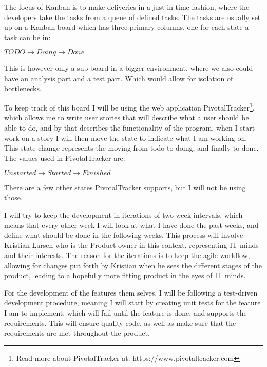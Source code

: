 The focus of Kanban is to make deliveries in a just-in-time fashion, where the
developers take the tasks from a queue of defined tasks. The tasks are usually
set up on a Kanban board which has three primary columns, one for each state a
task can be in: 

\begin{center}
  $TODO \rightarrow Doing \rightarrow Done$
\end{center}

This is however only a sub board in a bigger environment, where we also could
have an analysis part and a test part. Which would allow for isolation of
bottlenecks\cite{kanban}. 

To keep track of this board I will be using the web application
PivotalTracker\footnote{Read more about PivotalTracker at:
  https://www.pivotaltracker.com}, which allows me to write user stories that
will describe what a user should be able to do, and by that describes the
functionality of the program, when I start work on a story I will then move
the state to indicate what I am working on. This state change represents the
moving from todo to doing, and finally to done. The values used in
PivotalTracker are: 

\begin{center}
  $Unstarted \rightarrow Started \rightarrow Finished$
\end{center}

There are a few other states PivotalTracker supports, but I will not be using
those. 

I will try to keep the development in iterations of two week intervals, which
means that every other week I will look at what I have done the past weeks, and define
what should be done in the following weeks. This process will involve Kristian Larsen
who is the Product owner in this context, representing IT minds and their
interests. The reason for the iterations is to keep the agile workflow, allowing
for changes put forth by Kristian when he sees the different stages of the
product, leading to a hopefully more fitting product in the eyes of IT minds. 

For the development of the features them selves, I will be following a
test-driven development procedure, meaning I will start by creating unit tests
for the feature I am to implement, which will fail until the feature is done,
and supports the requirements. This will ensure quality code, as well as make
sure that the requirements are met throughout the product. 

